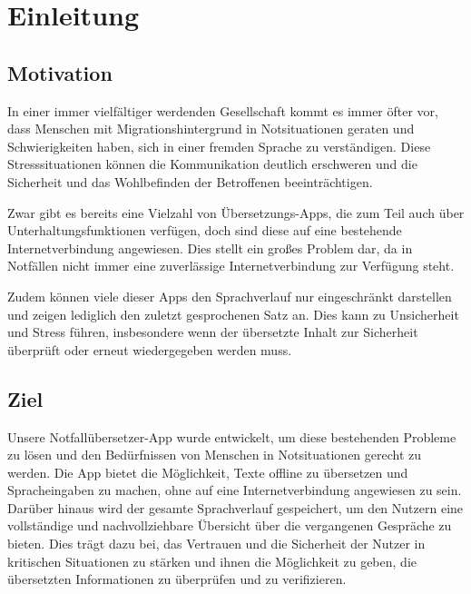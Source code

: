 \newpage
\section{Einleitung}\label{sec:introduction}

\subsection{Motivation}
In einer immer vielfältiger werdenden Gesellschaft kommt es immer öfter vor, dass Menschen mit Migrationshintergrund in Notsituationen geraten und Schwierigkeiten haben, sich in einer fremden Sprache zu verständigen. Diese Stresssituationen können die Kommunikation deutlich erschweren und die Sicherheit und das Wohlbefinden der Betroffenen beeinträchtigen.

Zwar gibt es bereits eine Vielzahl von Übersetzungs-Apps, die zum Teil auch über Unterhaltungsfunktionen verfügen, doch sind diese auf eine bestehende Internetverbindung angewiesen. Dies stellt ein großes Problem dar, da in Notfällen nicht immer eine zuverlässige Internetverbindung zur Verfügung steht. 

Zudem können viele dieser Apps den Sprachverlauf nur eingeschränkt darstellen und zeigen lediglich den zuletzt gesprochenen Satz an. Dies kann zu Unsicherheit und Stress führen, insbesondere wenn der übersetzte Inhalt zur Sicherheit überprüft oder erneut wiedergegeben werden muss.

\subsection{Ziel}
Unsere Notfallübersetzer-App wurde entwickelt, um diese bestehenden Probleme zu lösen und den Bedürfnissen von Menschen in Notsituationen gerecht zu werden. Die App bietet die Möglichkeit, Texte offline zu übersetzen und Spracheingaben zu machen, ohne auf eine Internetverbindung angewiesen zu sein. Darüber hinaus wird der gesamte Sprachverlauf gespeichert, um den Nutzern eine vollständige und nachvollziehbare Übersicht über die vergangenen Gespräche zu bieten. Dies trägt dazu bei, das Vertrauen und die Sicherheit der Nutzer in kritischen Situationen zu stärken und ihnen die Möglichkeit zu geben, die übersetzten Informationen zu überprüfen und zu verifizieren.